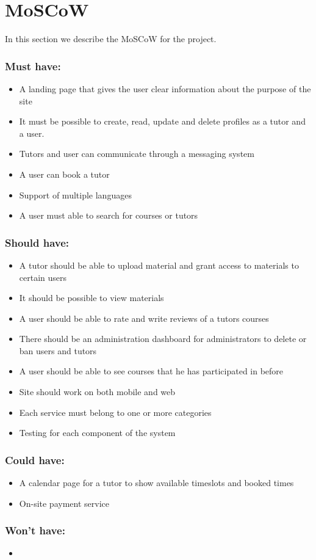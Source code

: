 \section{MoSCoW}
In this section we describe the MoSCoW for the project.
\subsubsection{Must have:}
\begin{itemize}
    \item A landing page that gives the user clear information about the purpose of the site
    \item It must be possible to create, read, update and delete profiles as a tutor and a user.
    \item Tutors and user can communicate through a messaging system
    \item A user can book a tutor
    \item Support of multiple languages
    \item A user must able to search for courses or tutors
\end{itemize}

\subsubsection{Should have:}
\begin{itemize}
    \item A tutor should be able to upload material and grant access to materials to certain users
    \item It should be possible to view materials
    \item A user should be able to rate and write reviews of a tutors courses
    \item There should be an administration dashboard for administrators to delete or ban users and tutors
    \item A user should be able to see courses that he has participated in before
    \item Site should work on both mobile and web
    \item Each service must belong to one or more categories
    \item Testing for each component of the system
\end{itemize}

\subsubsection{Could have:}
\begin{itemize}
    \item A calendar page for a tutor to show available timeslots and booked times 
    \item On-site payment service
\end{itemize}

\subsubsection{Won't have:}
\begin{itemize}
    \item 
\end{itemize}